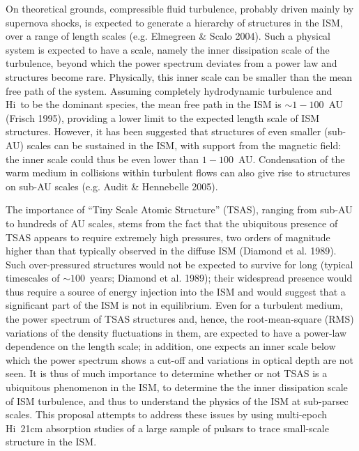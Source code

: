 \documentclass[11pt]{article}
\newcommand{\hi}{H{\sc i}}
\begin{document}

On theoretical grounds, compressible fluid turbulence, probably driven mainly by supernova shocks, is expected to generate a hierarchy of structures in the ISM, over a range of length scales (e.g. Elmegreen \& Scalo 2004).  Such a physical system is expected to have a scale, namely the inner dissipation scale of the turbulence, beyond which the power spectrum deviates from a power law and structures become rare. Physically, this inner scale can be smaller than the mean free path of the system. Assuming completely hydrodynamic turbulence and \hi\ to be the dominant species, the mean free path in the ISM is $\sim 1 - 100$~AU (Frisch 1995), providing a lower limit to the expected length scale of ISM structures. However, it has been suggested that structures of even smaller (sub-AU) scales can be sustained in the ISM, with support from the magnetic field: the inner scale could thus be even lower than $1-100$~AU. Condensation of the warm medium in collisions within turbulent flows can also give rise to structures on sub-AU scales (e.g. Audit \& Hennebelle 2005). 

The importance of ``Tiny Scale Atomic Structure'' (TSAS), ranging from sub-AU to hundreds of AU scales, stems from the fact that the ubiquitous presence of TSAS appears to require extremely high pressures, two orders of magnitude higher than that typically observed in the diffuse ISM (Diamond et al. 1989). Such over-pressured structures would not be expected to survive for long (typical timescales of $\sim 100$~years; Diamond et al. 1989); their widespread presence would thus require a source of energy injection into the ISM and would suggest that a significant part of the ISM is not in equilibrium. Even for a turbulent medium, the power spectrum of TSAS structures and, hence, the root-mean-square (RMS) variations of the density fluctuations in them, are expected to have a power-law dependence on the length scale; in addition, one expects an inner scale below which the power spectrum shows a cut-off and variations in optical depth are not seen. It is thus of much importance to determine whether or not TSAS is a ubiquitous phenomenon in the ISM, to determine the the inner dissipation scale of ISM turbulence, and thus to understand the physics of the ISM at sub-parsec scales. This proposal attempts to address these issues by using multi-epoch \hi~21cm absorption studies of a large sample of pulsars to trace small-scale structure in the ISM.
\end{document}
